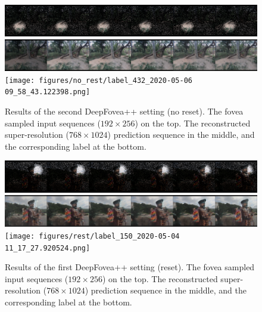 \documentclass[10pt,twocolumn,letterpaper]{article}
\begin{document}
\begin{figure}[htbp!]
    \centering
    \includegraphics[width=\columnwidth]{figures/no_rest/input_432_2020-05-06 09_58_44.696719.png}\\\vspace{-0.1cm}
    \includegraphics[width=\columnwidth]{figures/no_rest/prediction_432_2020-05-06 09_58_40.811600.png}\\\vspace{-0.1cm}
    \texttt{[image: figures/no\_rest/label\_432\_2020-05-06 09\_58\_43.122398.png]}\\
    \caption{Results of the second DeepFovea++ setting (no reset). The fovea sampled input sequences ($192 \times 256$) on the top. The reconstructed super-resolution ($768 \times 1024$) prediction sequence in the middle, and the corresponding label at the bottom.}
    \label{fig:norestresults2}
\end{figure}

\begin{figure}[htbp!]
    \centering
    \includegraphics[width=\columnwidth]{figures/rest/input_150_2020-05-04 11_17_29.891315.png}\\\vspace{-0.1cm}
    \includegraphics[width=\columnwidth]{figures/rest/prediction_150_2020-05-04 11_17_25.749898.png}\\\vspace{-0.1cm}
    \texttt{[image: figures/rest/label\_150\_2020-05-04 11\_17\_27.920524.png]}\\
    \caption{Results of the first DeepFovea++ setting (reset). The fovea sampled input sequences ($192 \times 256$) on the top. The reconstructed super-resolution ($768 \times 1024$) prediction sequence in the middle, and the corresponding label at the bottom.}
    \label{fig:restresults3}
\end{figure}
\end{document}
